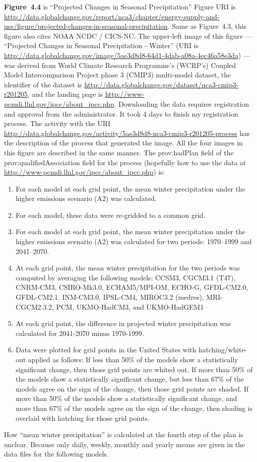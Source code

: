 \textbf{Figure~4.4} is ``Projected Changes in Seasonal Precipitation''
Figure URI is \url{http://data.globalchange.gov/report/nca3/chapter/energy-supply-and-use/figure/projected-changes-in-seasonal-precipitation}.
Same as Figure~4.3, this figure also cites NOAA NCDC / CICS-NC.
The upper-left image of this figure --- ``Projected Changes in Seasonal Precipitation - Winter'' (URI is \url{http://data.globalchange.gov/image/5ae3d8d8-64d1-4dab-a08a-4ec46a58e3da}) --- was derived from World Climate Research Programme's (WCRP's) Coupled Model Intercomparison Project phase 3 (CMIP3) multi-model dataset, the identifier of the dataset is \url{http://data.globalchange.gov/dataset/nca3-cmip3-r201205}, and the landing page is \url{http://www-pcmdi.llnl.gov/ipcc/about_ipcc.php}. Downloading the data requires registration and approval from the administrator. It took 4 days to finish my registration process.
The activity with the URI \url{http://data.globalchange.gov/activity/5ae3d8d8-nca3-cmip3-r201205-process} has the description of the process that generated the image.
All the four images in this figure are described in the same manner.
The prov:hadPlan field of the prov:qualifiedAssociation field for the process (hopefully how to use the data at \url{http://www-pcmdi.llnl.gov/ipcc/about_ipcc.php}) is:
\begin{enumerate}
\item For each model at each grid point, the mean winter precipitation under the higher emissions scenario (A2) was calculated.
\item For each model, these data were re-gridded to a common grid.
\item For each model at each grid point, the mean winter precipitation under the higher emissions scenario (A2) was calculated for two periods: 1970--1999 and 2041--2070.
\item At each grid point, the mean winter precipitation for the two periods was computed by averaging the following models:
CCSM3, CGCM3.1 (T47), CNRM-CM3, CSIRO-Mk3.0, ECHAM5/MPI-OM, ECHO-G, GFDL-CM2.0, GFDL-CM2.1, INM-CM3.0, IPSL-CM4, MIROC3.2 (medres), MRI-CGCM2.3.2, PCM, UKMO-HadCM3, and UKMO-HadGEM1
\item At each grid point, the difference in projected winter precipitation was calculated for 2041-2070 minus 1970-1999.
\item Data were plotted for grid points in the United States with hatching/white-out applied as follows:
If less than 50\% of the models show a statistically significant change, then those grid points are whited out. If more than 50\% of the models show a statistically significant change, but less than 67\% of the models agree on the sign of the change, then those grid points are shaded. If more than 50\% of the models show a statistically significant change, and more than 67\% of the models agree on the sign of the change, then shading is overlaid with hatching for those grid points.
\end{enumerate} 
How ``mean winter precipitation'' is calculated at the fourth step of the plan is unclear. Because only daily, weekly, monthly and yearly means are given in the data files for the following models.


